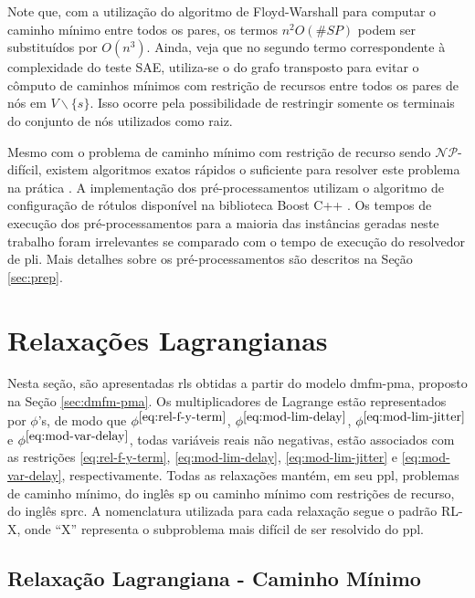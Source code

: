 Note  que, com  a  utilização do  algoritmo de  Floyd-Warshall  para computar  o
caminho  mínimo  entre  todos  os  pares, os  termos  $n^2  O(\#SP)$  podem  ser
substituídos por  $O(n^3)$. Ainda,  veja que no  segundo termo  correspondente à
complexidade  do teste  SAE,  utiliza-se o  do grafo  transposto  para evitar  o
cômputo de  caminhos mínimos com restrição  de recursos entre todos  os pares de
nós em $V\backslash \{s\}$. Isso ocorre pela possibilidade de restringir somente
os terminais do conjunto de nós utilizados como raiz.

Mesmo  com  o  problema  de  caminho  mínimo  com  restrição  de  recurso  sendo
$\mathcal{NP}$-difícil,  existem algoritmos  exatos  rápidos  o suficiente  para
resolver  este  problema  na  prática \cite{irnich:2006}.  A  implementação  dos
pré-processamentos utilizam o algoritmo de configuração de rótulos disponível na
biblioteca   Boost   C++   \cite{boost:2020}.   Os  tempos   de   execução   dos
pré-processamentos para  a maioria das  instâncias geradas neste  trabalho foram
irrelevantes se  comparado com o tempo  de execução do resolvedor  de \gls{pli}.
Mais detalhes sobre os pré-processamentos são descritos na Seção \ref{sec:prep}.

\section{Relaxações Lagrangianas} \label{sec:rl-pma}

\newcommand{\mult}[2]{\ensuremath{\phi^{#1}_{#2}}}

Nesta   seção,  são   apresentadas  \gls{rl}s   obtidas  a   partir  do   modelo
\gls{dmfm-pma},  proposto na  Seção  \ref{sec:dmfm-pma}.  Os multiplicadores  de
Lagrange     estão    representados     por     $\phi$'s,     de    modo     que
\mult{\ref{eq:rel-f-y-term}}{},                 \mult{\ref{eq:mod-lim-delay}}{},
\mult{\ref{eq:mod-lim-jitter}}{}   e    \mult{\ref{eq:mod-var-delay}}{},   todas
variáveis   reais   não   negativas,   estão  associados   com   as   restrições
\eqref{eq:rel-f-y-term},  \eqref{eq:mod-lim-delay}, \eqref{eq:mod-lim-jitter}  e
\eqref{eq:mod-var-delay}, respectivamente.  Todas as  relaxações mantém,  em seu
\gls{ppl}, problemas de caminho mínimo, do inglês \gls{sp} ou caminho mínimo com
restrições de recurso, do inglês  \gls{sprc}. A nomenclatura utilizada para cada
relaxação segue o padrão RL-X, onde  ``X'' representa o subproblema mais difícil
de ser resolvido do \gls{ppl}.

\subsection{Relaxação Lagrangiana - Caminho Mínimo} \label{subsec:rl-sp}

